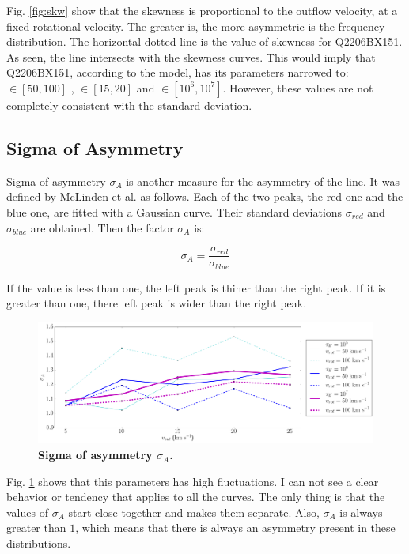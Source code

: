 Fig. \ref{fig:skw} show that the skewness is proportional to the outflow velocity, at a fixed rotational velocity. The greater \vout is, the more asymmetric is the \lya frequency distribution. The horizontal dotted line is the value of skewness for Q2206BX151. As seen, the line intersects with the skewness curves. This would imply that Q2206BX151, according to the model, has its parameters narrowed to: \vrot $\in [50,100]$ \kms, \vout $\in [15,20]$ \kms and \tauh $\in [10^6, 10^7]$. However, these values are not completely consistent with the standard deviation.\\

\subsection{Sigma of Asymmetry}
Sigma of asymmetry $\sigma_A$ is another measure for the asymmetry of the \lya line. It was defined by McLinden et al. \cite{McLinden2011} as follows. Each of the two peaks, the red one and the blue one, are fitted with a Gaussian curve. Their standard deviations $\sigma_{red}$ and $\sigma_{blue}$ are obtained. Then the factor $\sigma_A$ is:

\begin{equation}
\sigma_A = \frac{\sigma_{red}}{\sigma_{blue}}
\end{equation}

If the value is less than one, the left peak is thiner than the right peak. If it is greater than one, there left peak is wider than the right peak.\\

\begin{figure}[h!]
	\begin{center}
		\includegraphics[width=1\textwidth]{./figures/chapter3/sigma}
	\end{center}
	\caption{\textbf{Sigma of asymmetry $\sigma_A$.} 
		\label{fig:sigma}}
\end{figure}

Fig. \ref{fig:sigma} shows that this parameters has high fluctuations. I can not see a clear behavior or tendency that applies to all the curves. The only thing is that the values of $\sigma_A$ start close together and \vout makes them separate. Also, $\sigma_A$ is always greater than $1$, which means that there is always an asymmetry present in these distributions.\\ 

